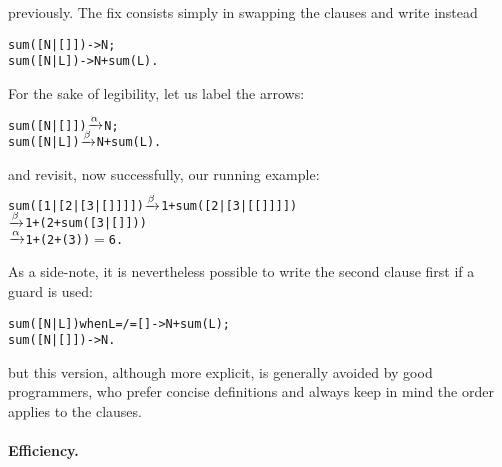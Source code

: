 previously. The fix consists simply in swapping the clauses and write
instead
\begin{alltt}
sum([N|[]]) -> N;\hfill% \emph{Must come first}
sum([N| L]) -> N + sum(L).
\end{alltt}
For the sake of legibility, let us label the arrows:
\begin{alltt}
sum([N|[]]) \(\xrightarrow{\smash[t]{\alpha}}\) N;
sum([N| L]) \(\xrightarrow{\smash[t]{\beta}}\) N + sum(L).
\end{alltt}
and revisit, now successfully, our running example:
\begin{alltt}
sum([1|[2|[3|[]]]]) \(\xrightarrow{\smash[t]{\beta}}\) 1 + sum([2|[3|[[]]]])
                    \(\xrightarrow{\smash[t]{\beta}}\) 1 + (2 + sum([3|[]]))
                    \(\xrightarrow{\smash[t]{\alpha}}\) 1 + (2 + (3))         \(=\) 6.
\end{alltt}
\noindent As a side\hyp{}note, it is nevertheless possible to write
the second clause first if a guard is used:
\begin{alltt}
sum([N| L]) when L =/= [] -> N + sum(L);\hfill% L \(\neq\) []
sum([N|[]])               -> N.
\end{alltt}
but this version, although more explicit, is generally avoided by good
programmers, who prefer concise definitions and always keep in mind
the order \Erlang applies to the clauses.

\medskip

\paragraph{Efficiency.}

